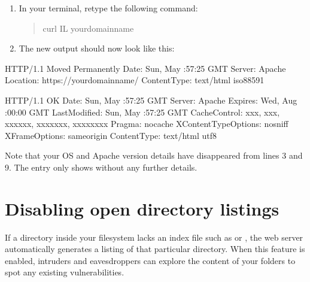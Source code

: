 \documentclass[letterpaper,10pt,english]{sphinxmanual}
\begin{document}
\begin{enumerate}
\item {} 
\sphinxAtStartPar
In your terminal, retype the following command:
\begin{quote}

\begin{sphinxVerbatim}[commandchars=\\\{\}]
\PYGZdl{} curl \PYGZhy{}IL your\PYGZhy{}domain\PYGZhy{}name
\end{sphinxVerbatim}
\end{quote}

\item {} 
\sphinxAtStartPar
The new output should now look like this:

\end{enumerate}

\begin{sphinxVerbatim}[commandchars=\\\{\},numbers=left,firstnumber=1,stepnumber=1]
HTTP/1.1  Moved Permanently
Date: Sun,  May  :57:25 GMT
Server: Apache
Location: https://your\PYGZhy{}domain\PYGZhy{}name/
Content\PYGZhy{}Type: text/html iso\PYGZhy{}8859\PYGZhy{}1

HTTP/1.1  OK
Date: Sun,  May  :57:25 GMT
Server: Apache
Expires: Wed,  Aug  :00:00 GMT
Last\PYGZhy{}Modified: Sun,  May  :57:25 GMT
Cache\PYGZhy{}Control: xxx, xxx, xxx\PYGZhy{}xxx, xxxxxxx, xxxxxxxx
Pragma: no\PYGZhy{}cache
X\PYGZhy{}Content\PYGZhy{}Type\PYGZhy{}Options: nosniff
X\PYGZhy{}Frame\PYGZhy{}Options: sameorigin
Content\PYGZhy{}Type: text/html utf\PYGZhy{}8
\end{sphinxVerbatim}

\sphinxAtStartPar
Note that your OS and Apache version details have disappeared from lines 3 and 9. The  entry only shows  without any further details.


\section{Disabling open directory listings}
\label{\detokenize{hardening-apache:disabling-open-directory-listings}}
\sphinxAtStartPar
If a directory inside your filesystem lacks an index file such as  or , the web server automatically generates a listing of that particular directory. When this feature is enabled, intruders and eavesdroppers can explore the content of your folders to spot any existing vulnerabilities.
\end{document}

